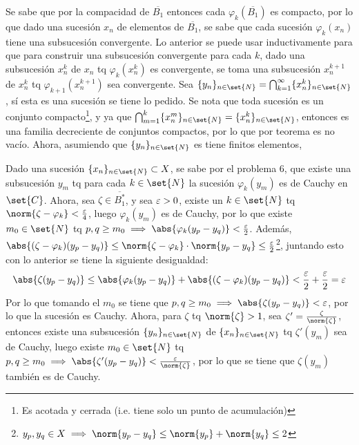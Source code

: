 \documentclass{homework}
\begin{document}
\begin{sol}
    Se sabe que por la compacidad de \(\overline{B_1}\) entonces cada \(\varphi_k(\overline{B_1})\) es compacto, por lo que dado una sucesión \(x_n\) de elementos de \(\overline{B_1}\), se sabe que cada sucesión \(\varphi_k(x_n)\) tiene una subsucesión convergente. Lo anterior se puede usar inductivamente para que para construir una subsucesión convergente para cada \(k\), dado una subsucesión \(x^k_n\) de \(x_n\) tq \(\varphi_k(x^k_n)\) es convergente, se toma una subsucesión \(x^{k+1}_n\) de \(x^k_n\) tq \(\varphi_{k+1}(x^{k+1}_n)\) sea convergente. Sea \(\{y_n\}_{n\in\set{N}}=\bigcap_{k=1}^\infty\{x_n^k\}_{n\in\set{N}}\), sí esta es una sucesión se tiene lo pedido. Se nota que toda sucesión es un conjunto compacto\footnote{Es acotada y cerrada (i.e. tiene solo un punto de acumulación)}, y ya que \(\bigcap_{m=1}^k\{x_n^m\}_{n\in\set{N}}=\{x_n^k\}_{n\in\set{N}}\), entonces es una familia decreciente de conjuntos compactos, por lo que por teorema es no vacío. Ahora, asumiendo que \(\{y_n\}_{n\in\set{N}}\) es tiene finitos elementos, 
\end{sol}

\begin{sol}
    Dado una sucesión \(\{x_n\}_{n\in\set{N}}\subset X\), se sabe por el problema 6, que existe una subsucesión \(y_m\) tq para cada \(k\in\set{N}\) la sucesión \(\varphi_k(y_m)\) es de Cauchy en \(\set{C}\). Ahora, sea \(\zeta\in\overline{B_1^*}\), y sea \(\varepsilon>0\), existe un \(k\in\set{N}\) tq \(\norm{\zeta-\varphi_k}<\frac\e4\), luego \(\varphi_k(y_m)\) es de Cauchy, por lo que existe \(m_0\in\set{N}\) tq \(p,q\geq m_0\implies\abs{\varphi_k(y_p-y_q)}<\frac\e2\). Además, \(\abs{(\zeta-\varphi_k)(y_p-y_q)}\leq\norm{\zeta-\varphi_k}\cdot\norm{y_p-y_q}\leq\frac\e2\)\footnote{\(y_p,y_q\in X\implies \norm{y_p-y_q}\leq\norm{y_p}+\norm{y_q}\leq2\)}, juntando esto con lo anterior se tiene la siguiente desigualdad:
    \begin{equation*}
        \abs{\zeta(y_p-y_q)}\leq\abs{\varphi_k(y_p-y_q)}+\abs{(\zeta-\varphi_k)(y_p-y_q)}<\frac\e2+\frac\e2=\e
    \end{equation*}
    Por lo que tomando el \(m_0\) se tiene que \(p,q\geq m_0\implies\abs{\zeta(y_p-y_q)}<\e\), por lo que la sucesión es Cauchy. Ahora, para \(\zeta\) tq \(\norm{\zeta}>1\), sea \(\zeta'=\frac\zeta{\norm{\zeta}}\), entonces existe una subsucesión \(\{y_n\}_{n\in\set{N}}\) de \(\{x_n\}_{n\in\set{N}}\) tq \(\zeta'(y_m)\) sea de Cauchy, luego existe \(m_0\in\set{N}\) tq \(p,q\geq m_0\implies\abs{\zeta'(y_p-y_q)}<\frac\e{\norm{\zeta}}\), por lo que se tiene que \(\zeta(y_m)\) también es de Cauchy.
\end{sol}
\end{document}
